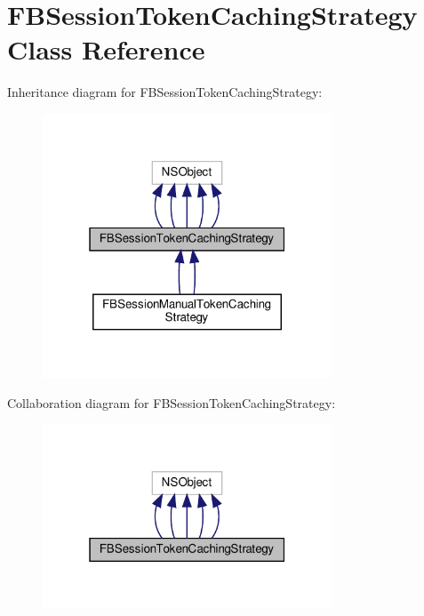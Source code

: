 \hypertarget{interfaceFBSessionTokenCachingStrategy}{}\section{F\+B\+Session\+Token\+Caching\+Strategy Class Reference}
\label{interfaceFBSessionTokenCachingStrategy}


Inheritance diagram for F\+B\+Session\+Token\+Caching\+Strategy\+:
\nopagebreak
\begin{figure}[H]
\begin{center}
\leavevmode
\includegraphics[width=244pt]{interfaceFBSessionTokenCachingStrategy__inherit__graph}
\end{center}
\end{figure}


Collaboration diagram for F\+B\+Session\+Token\+Caching\+Strategy\+:
\nopagebreak
\begin{figure}[H]
\begin{center}
\leavevmode
\includegraphics[width=244pt]{interfaceFBSessionTokenCachingStrategy__coll__graph}
\end{center}
\end{figure}
